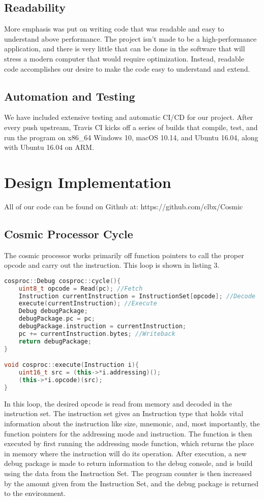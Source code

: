 \documentclass[conference]{IEEEtran}
\begin{document}
\subsection{Readability}
More emphasis was put on writing code that was readable and easy to understand above performance. The project isn't made to be a high-performance application, and there is very little that can be done in the software that will stress a modern computer that would require optimization. Instead, readable code accomplishes our desire to make the code easy to understand and extend.


\subsection{Automation and Testing}

We have included extensive testing and automatic CI/CD for our project. After every push upstream, Travis CI kicks off a series of builds that compile, test, and run the program on x86\_64 Windows 10, macOS 10.14, and Ubuntu 16.04, along with Ubuntu 16.04 on ARM.


\section{Design Implementation}
All of our code can be found on Github at: https://github.com/clbx/Cosmic
\subsection{Cosmic Processor Cycle}
The cosmic processor works primarily off function pointers to call the proper opcode and carry out the instruction. This loop is shown in listing 3.

\begin{lstlisting}[language=C++, caption=Instruction Execution Loop]
cosproc::Debug cosproc::cycle(){
	uint8_t opcode = Read(pc); //Fetch
	Instruction currentInstruction = InstructionSet[opcode]; //Decode
	execute(currentInstruction); //Execute
	Debug debugPackage;
	debugPackage.pc = pc;
	debugPackage.instruction = currentInstruction;
	pc += currentInstruction.bytes; //Writeback
	return debugPackage;
}

void cosproc::execute(Instruction i){
	uint16_t src = (this->*i.addressing)();
	(this->*i.opcode)(src);
}
\end{lstlisting}
In this loop, the desired opcode is read from memory and decoded in the instruction set. The instruction set gives an Instruction type that holds vital information about the instruction like size, mnemonic, and, most importantly, the function pointers for the addressing mode and instruction. The function is then executed by first running the addressing mode function, which returns the place in memory where the instruction will do its operation. After execution, a new debug package is made to return information to the debug console, and is build using the data from the Instruction Set. The program counter is then increased by the amount given from the Instruction Set, and the debug package is returned to the environment.
\end{document}
